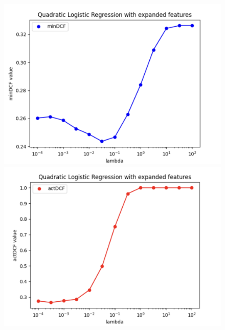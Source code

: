 \documentclass{article}
\begin{document}
\begin{figure}[H]
    \centering
    \begin{minipage}{.3\textwidth}
        \centering
        \includegraphics[width=\linewidth]{./img/QLR1.png}
    \end{minipage}%
    \begin{minipage}{.3\textwidth}
        \centering
        \includegraphics[width=\linewidth]{./img/QLR2.png}
    \end{minipage}
    \begin{minipage}{.3\textwidth}
        \centering

\end{minipage}
\end{figure}
\end{document}
